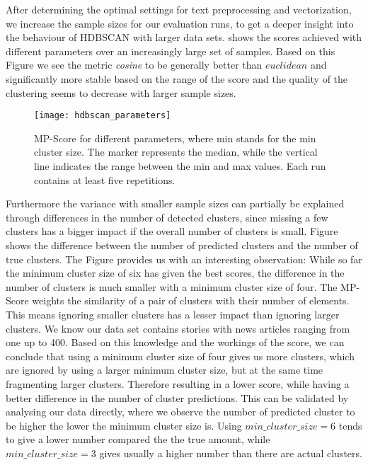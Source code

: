 After determining the optimal settings for text preprocessing and vectorization,
we increase the sample sizes for our evaluation runs,
to get a deeper insight into the behaviour of HDBSCAN with larger data sets.
 shows the scores achieved with different parameters over an increasingly large set of samples.
Based on this Figure we see the metric \textit{cosine} to be generally better than $euclidean$
and significantly more stable based on the range of the score and the quality of the clustering seems to decrease with larger sample sizes.

\begin{figure}[h]
    \centering
    \texttt{[image: hdbscan\_parameters]}
    \caption{MP-Score for different parameters, where min stands for the min cluster size. The marker represents the median, while the vertical line indicates the range between the min and max values. Each run contains at least five repetitions.}
    \label{fig:hdbscan_parameters}
\end{figure}

Furthermore the variance with smaller sample sizes can partially be explained through differences in the number of detected clusters,
since missing a few clusters has a bigger impact if the overall number of clusters is small.
Figure \label{fig:cluster_difference_samples} shows the difference between the number of predicted clusters and the number of true clusters.
The Figure provides us with an interesting observation:
While so far the minimum cluster size of six has given the best scores,
the difference in the number of clusters is much smaller with a minimum cluster size of four.
The MP-Score weights the similarity of a pair of clusters with their number of elements.
This means ignoring smaller clusters has a lesser impact than ignoring larger clusters.
We know our data set contains stories with news articles ranging from one up to 400.
Based on this knowledge and the workings of the score,
we can conclude that using a minimum cluster size of four gives us more clusters,
which are ignored by using a larger minimum cluster size, but at the same time fragmenting larger clusters.
Therefore resulting in a lower score, while having a better difference in the number of cluster predictions.
This can be validated by analysing our data directly, where we observe the number of predicted cluster to be higher the lower the minimum cluster size is.
Using $min\_cluster\_size=6$ tends to give a lower number compared the the true amount,
while $min\_cluster\_size=3$ gives usually a higher number than there are actual clusters.

